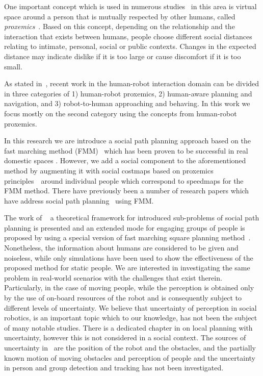 One important concept which is used in numerous studies~\cite{Mumm2011,Takayama2009,Walters2011,ferrer2013robot} in this area is virtual space around a person that is mutually respected by other humans, called \textit{proxemics}~\cite{Hall1969}.
Based on this concept, depending on the relationship and the interaction that exists between humans, people choose different social distances relating to intimate, personal, social or public contexts.
Changes in the expected distance may indicate dislike if it is too large or cause discomfort if it is too small.



As stated in~\cite{gomez2013social}, recent work in the human-robot interaction domain can be divided in three categories of 1) human-robot proxemics, 2) human-aware planning and navigation, and 3) robot-to-human approaching and behaving. In this work we focus mostly on the second category using the concepts from human-robot proxemics. %

In this research we are introduce a social path planning approach based on the fast marching method (FMM)~\cite{sethian1999fast} which has been proven to be successful in real domestic spaces \cite{ventura2015}. However, we add a social component to the aforementioned method by augmenting it with social costmaps \textemdash based on proxemics principles~\cite{kirby2009companion}\textemdash~around individual people which correspond to speedmaps for the FMM method. There have previously been a number of research papers which have address social path planning~\cite{gomez2014fast,gomez2013social} using FMM. 

The work of ~\cite{gomez2014fast} a theoretical framework for introduced sub-problems of social path planning is presented and an extended mode for engaging groups of people is proposed by using a special version of fast marching square planning method~\cite{valero2013fast}. Nonetheless, the information about humans are considered to be given and noiseless, while only simulations have been used to show the effectiveness of the proposed method for static people. We are interested in investigating the same problem in real-world scenarios with the challenges that exist therein. Particularly, in the case of moving people, while the perception is obtained only by the use of on-board resources of the robot and is consequently subject to different levels of uncertainty. 
We believe that uncertainty of perception in social robotics, is an important topic which to our knowledge, has not been the subject of many notable studies. There is a dedicated chapter in \cite{correa2014uncertainty} on local planning with uncertainty, however this is not considered in a social context. The sources of uncertainty in~\cite{correa2014uncertainty} are the position of the robot and the obstacles, and the partially known motion of moving obstacles and perception of people and the uncertainty in person and group detection and tracking has not been investigated.


